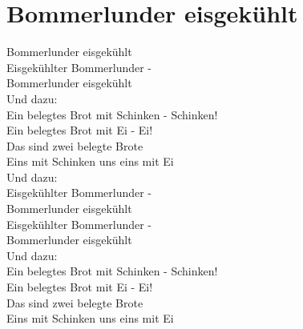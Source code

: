 \documentclass[twoside,8pt]{scrartcl}
\begin{document}
\section{Bommerlunder eisgekühlt}
Bommerlunder eisgekühlt\\
Eisgekühlter Bommerlunder -\\
Bommerlunder eisgekühlt\\
\newline
Und dazu:\\
Ein belegtes Brot mit Schinken - Schinken!\\
Ein belegtes Brot mit Ei - Ei!\\
Das sind zwei belegte Brote\\
Eins mit Schinken uns eins mit Ei\\
\newline
Und dazu:\\
Eisgekühlter Bommerlunder -\\
Bommerlunder eisgekühlt\\
Eisgekühlter Bommerlunder -\\
Bommerlunder eisgekühlt\\
\newline
Und dazu:\\
Ein belegtes Brot mit Schinken - Schinken!\\
Ein belegtes Brot mit Ei - Ei!\\
Das sind zwei belegte Brote\\
Eins mit Schinken uns eins mit Ei\\
\clearpage
\end{document}
